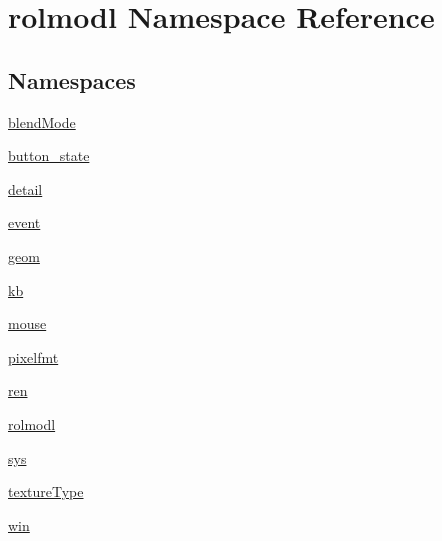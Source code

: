 \hypertarget{namespacerolmodl}{}\section{rolmodl Namespace Reference}
\label{namespacerolmodl}
\subsection*{Namespaces}
\begin{DoxyCompactItemize}
\item 
 \mbox{\hyperlink{namespacerolmodl_1_1blend_mode}{blend\+Mode}}
\item 
 \mbox{\hyperlink{namespacerolmodl_1_1button__state}{button\+\_\+state}}
\item 
 \mbox{\hyperlink{namespacerolmodl_1_1detail}{detail}}
\item 
 \mbox{\hyperlink{namespacerolmodl_1_1event}{event}}
\item 
 \mbox{\hyperlink{namespacerolmodl_1_1geom}{geom}}
\item 
 \mbox{\hyperlink{namespacerolmodl_1_1kb}{kb}}
\item 
 \mbox{\hyperlink{namespacerolmodl_1_1mouse}{mouse}}
\item 
 \mbox{\hyperlink{namespacerolmodl_1_1pixelfmt}{pixelfmt}}
\item 
 \mbox{\hyperlink{namespacerolmodl_1_1ren}{ren}}
\item 
 \mbox{\hyperlink{namespacerolmodl_1_1rolmodl}{rolmodl}}
\item 
 \mbox{\hyperlink{namespacerolmodl_1_1sys}{sys}}
\item 
 \mbox{\hyperlink{namespacerolmodl_1_1texture_type}{texture\+Type}}
\item 
 \mbox{\hyperlink{namespacerolmodl_1_1win}{win}}
\end{DoxyCompactItemize}
